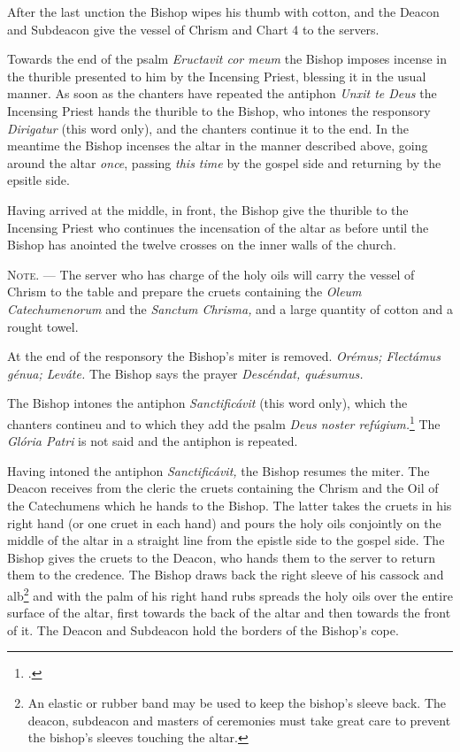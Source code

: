 \documentclass[letterpaper]{report}
\begin{document}
{After the last unction the Bishop wipes his thumb with cotton, and the Deacon
and Subdeacon give the vessel of Chrism and Chart 4 to the servers.

\rubric Towards the end of the psalm \textit{Eructavit cor meum} the Bishop
imposes incense in the thurible presented to him by the Incensing Priest,
blessing it in the usual manner. As soon as the chanters have repeated the
antiphon \textit{Unxit te Deus} the Incensing Priest hands the thurible to the
Bishop, who intones the responsory \textit{Dirigatur} (this word only), and the
chanters continue it to the end. In the meantime the Bishop incenses the altar
in the manner described above, going around the altar \textit{once}, passing
\textit{this time} by the gospel side and returning by the epsitle side.

\rubric Having arrived at the middle, in front, the Bishop give the thurible to
the Incensing Priest who continues the incensation of the altar as before until
the Bishop has anointed the twelve crosses on the inner walls of the church.

\textsc{Note. ---} The server who has charge of the holy oils will carry the
vessel of Chrism to the table and prepare the cruets containing the
\textit{Oleum Catechumenorum} and the \textit{Sanctum Chrisma,} and a large
quantity of cotton and a rought towel.

\rubric At the end of the responsory the Bishop's miter is removed.
\textit{Orémus; Flectámus génua; Leváte.} The Bishop says the prayer
\textit{Descéndat, qu\'\ae sumus.}

\rubric The Bishop intones the antiphon \textit{Sanctificávit} (this word
only), which the chanters contineu and to which they add the psalm \textit{Deus
noster refúgium.}\footcite[The antiphon \textit{Sanctificávit Dóminus} may be
repeated after each verse of this psalm.][footnote 1, p. 108.]{consecranda} The
\textit{Glória Patri} is not said and the antiphon is repeated.

\rubric Having intoned the antiphon \textit{Sanctificávit,} the Bishop resumes
the miter. The Deacon receives from the cleric the cruets containing the Chrism
and the Oil of the Catechumens which he hands to the Bishop. The latter takes
the cruets in his right hand (or one cruet in each hand) and pours the holy
oils conjointly on the middle of the altar in a straight line from the epistle
side to the gospel side. The Bishop gives the cruets to the Deacon, who hands
them to the server to return them to the credence. The Bishop draws back the
right sleeve of his cassock and alb\footnote{An elastic or rubber band may be
used to keep the bishop's sleeve back. The deacon, subdeacon and masters of
ceremonies must take great care to prevent the bishop's sleeves touching the
altar.} and with the palm of his right hand rubs spreads the holy oils over the
entire surface of the altar, first towards the back of the altar and then
towards the front of it. The Deacon and Subdeacon hold the borders of the
Bishop's cope.

}
\end{document}
